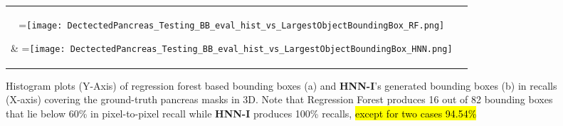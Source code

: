 \documentclass[journal]{IEEEtran}
\newcommand*{\vcenteredhbox}[1]{\begingroup\setbox0=\hbox{#1}\parbox{\wd0}{\box0}\endgroup}
\begin{document}
\begin{figure}[htb]\centering
	\begin{tabular}{cc}
			\vcenteredhbox{\texttt{[image: DectectedPancreas\_Testing\_BB\_eval\_hist\_vs\_LargestObjectBoundingBox\_RF.png]}} &
			\vcenteredhbox{\texttt{[image: DectectedPancreas\_Testing\_BB\_eval\_hist\_vs\_LargestObjectBoundingBox\_HNN.png]}} \\
			(a) regression forest & (b) \textbf{HNN-I}\\
	\end{tabular}
	\caption{\small Histogram plots (Y-Axis) of regression forest based bounding boxes (a) and \textbf{HNN-I}'s generated bounding boxes (b) in recalls (X-axis) covering the ground-truth pancreas masks in 3D. Note that Regression Forest produces 16 out of 82 bounding boxes that lie below 60\% in pixel-to-pixel recall while \textbf{HNN-I} produces 100\% recalls, \hl{except for two cases 94.54\%}}		
	\label{fig:recall_histograms}
\end{figure}
\end{document}
